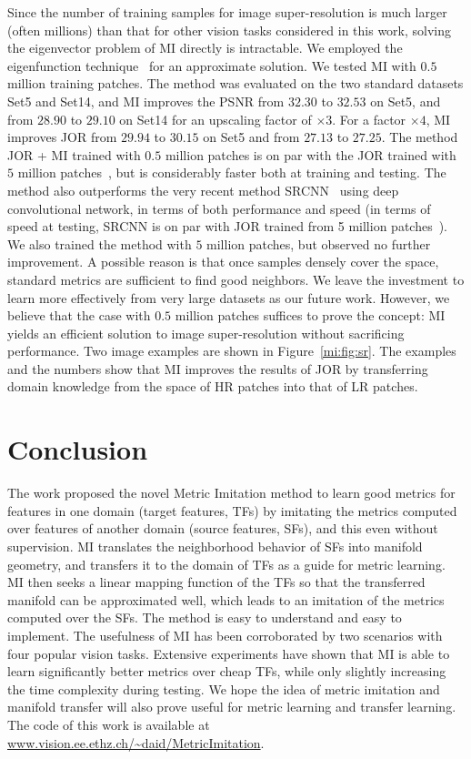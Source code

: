 Since the number of training samples for image super-resolution is
much larger (often millions) than that for other vision tasks considered 
in this work, solving the eigenvector problem of MI directly is 
intractable. We employed the eigenfunction technique~\citep{Fergus09} 
for an approximate solution.  We
tested MI with $0.5$ million training patches.  The method was
evaluated on the two standard datasets Set5 and Set14, and MI improves
the PSNR from $32.30$ to $32.53$ on Set5, and from $28.90$ to $29.10$
on Set14 for an upscaling factor of $\times 3$. For a factor $\times 4$,
MI improves JOR from $29.94$ to $30.15$ on Set5 and from $27.13$ to
$27.25$. The method JOR + MI trained with $0.5$ million patches is on
par with the JOR trained with $5$ million patches~\citep{JOR:EG15}, but
is considerably faster both at training and testing.  The method also
outperforms the very recent method SRCNN~\citep{Dong-ECCV-2014} using
deep convolutional network, in terms of both performance and speed (in
terms of speed at testing, SRCNN is on par with JOR trained from 5
million patches~\citep{JOR:EG15}). We also trained the
method with $5$ million patches, but observed no further improvement. 
A possible reason is that once samples densely cover
the space, standard metrics are sufficient to find good
neighbors. We leave the investment to learn more effectively from very large datasets as our future work. 
However, we believe that the case with $0.5$ million
patches suffices to prove the concept: MI yields an
efficient solution to image super-resolution without sacrificing 
performance. 
Two image examples are shown in Figure~\ref{mi:fig:sr}. The examples and
the numbers show that MI improves the results of JOR by
transferring domain knowledge from the space of HR patches into that
of LR patches. 

\section{Conclusion}
\label{mi:sec:con}
The work proposed the novel Metric Imitation method to
learn good metrics for features in one domain (target
features, TFs) by imitating the metrics computed over features of
another domain (source features, SFs), and this even without supervision. 
MI translates the neighborhood
behavior of SFs into manifold geometry, and transfers it to the domain
of TFs as a guide for metric learning. MI then seeks a linear mapping
function of the TFs so that the transferred manifold can be
approximated well, which leads to an imitation of the metrics computed
over the SFs. The method is easy to understand and easy to implement. The usefulness
of MI has been corroborated by two scenarios with four popular vision
tasks. Extensive experiments have shown that MI is able to learn 
significantly better metrics over cheap TFs, while only slightly
increasing the time complexity during testing. We hope the idea of metric
imitation and manifold transfer will also prove useful for metric
learning and transfer learning. The code of this work is available at
  \url{www.vision.ee.ethz.ch/~daid/MetricImitation}.

